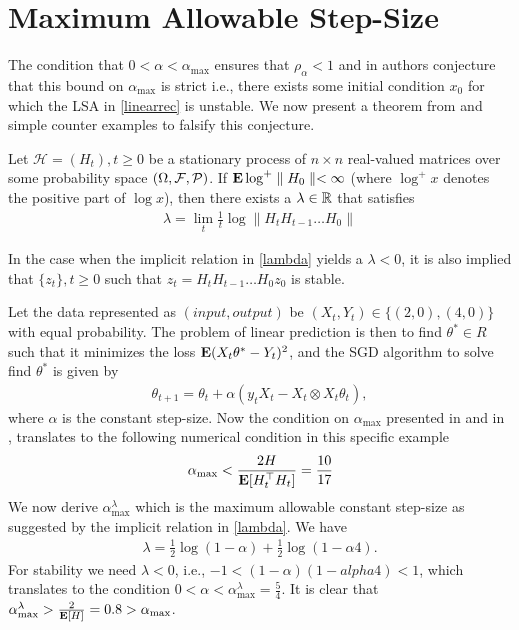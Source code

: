 \section{Maximum Allowable Step-Size}\label{opti}
The condition that $0<\alpha<\alpha_{\max}$ ensures that $\rho_{\alpha}<1$ and in \cite{bachaistats} authors conjecture that this bound on $\alpha_{\max}$ is strict i.e., there exists some initial condition $x_0$ for which the LSA in \eqref{linearrec} is unstable. We now present a theorem from \cite{logexp} and simple counter examples to falsify this conjecture.
\begin{theorem}\label{explog}
Let $\mathcal{H}=(H_t), t\geq 0$ be a stationary process of $n\times n$ real-valued matrices over some probability space $(\Omega,\mathcal{F},\mathcal{P})$. If $\mathbf{E}\log^+\parallel H_0\parallel<\infty$ (where $\log^+ x$ denotes the positive part of $\log x$), then there exists a $\lambda\in \mathbb{R}$ that satisfies
\begin{align}\label{lambda}
\lambda=\lim_{t}\frac{1}{t}\log\parallel H_t H_{t-1}\ldots H_0\parallel
\end{align}
\end{theorem}
In the case when the implicit relation in \eqref{lambda} yields a $\lambda<0$, it is also implied that $\{z_t\},t\geq 0$ such that $z_t=H_t H_{t-1}\ldots H_0z_0$ is stable.
\begin{example}
Let the data represented as $(input,output)$ be $(X_t,Y_t)\in \{(2,0), (4,0)\}$ with equal probability. The problem of linear prediction is then to find $\theta^*\in R$ such that it minimizes the loss $\mathbf{E}(X_t \theta^* -Y_t)^2$, and the SGD algorithm to solve find $\theta^*$ is given by
\begin{align}
\theta_{t+1}=\theta_t+\alpha(y_t X_t-X_t\otimes X_t\theta_t),
\end{align}
where $\alpha$ is the constant step-size. Now the condition on $\alpha_{\max}$ presented in  and in \cite{bachaistats}, translates to the following numerical condition in this specific example
\begin{align*}
\alpha_{\max}<\frac{2H}{\mathbf{E}[H_t^\top H_t]}=\frac{10}{17}
\end{align*}
We now derive $\alpha^{\lambda}_{\max}$ which is the maximum allowable constant step-size as suggested by the implicit relation in \eqref{lambda}. We have
\begin{align}
\lambda=\frac{1}{2}\log(1-\alpha)+\frac{1}{2}\log(1-\alpha 4).
\end{align}
For stability we need $\lambda<0$, i.e., $-1<(1-\alpha)(1-alpha 4)<1$, which translates to the condition $0<\alpha<\alpha^{\lambda}_{\max}=\frac{5}{4}$. It is clear that $\alpha^{\lambda}_{\max}>\frac{2}{\mathbf{E}[H]}=0.8>\alpha_{\max}$.
\end{example}

